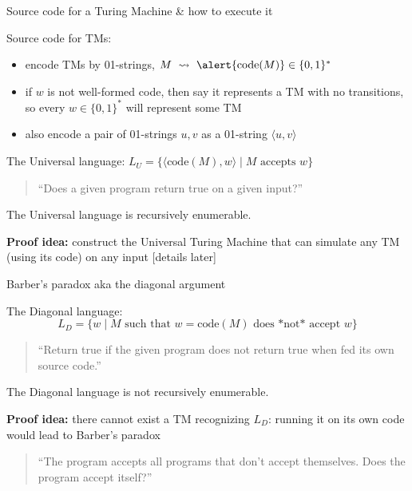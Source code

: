 \documentclass[handout]{beamer}
\begin{document}
\begin{frame}{Source code for a Turing Machine \& how to execute it}

    Source code for TMs:
    \begin{itemize}
        \item encode TMs by 01-strings, $M\ \rightsquigarrow\ \alert{\mathrm{code}(M)}\in\{0,1\}^*$
        \item if $w$ is not well-formed code, then say it represents a TM with no transitions, so every $w\in\{0,1\}^*$ will represent some TM
        \item also encode a pair of 01-strings $u,v$ as a 01-string $\langle u,v\rangle$
    \end{itemize}

    \medskip

    The \alert{Universal language}: $L_U=\{\langle \mathrm{code}(M),w\rangle\mid M\text{ accepts }w\}$

    \medskip
    
    \begin{quote}
        ``Does a given program return true on a given input?''
    \end{quote}

    \medskip

    \begin{theorem}
        The Universal language is recursively enumerable.
    \end{theorem}

    \textbf{Proof idea:} construct the \alert{Universal Turing Machine} that can simulate any TM (using its code) on any input [details later]

\end{frame}


\begin{frame}{Barber's paradox aka the diagonal argument}


    The \alert{Diagonal language}:
    $$
    L_D=\{w\mid M\text{ such that $w=\mathrm{code}(M)$ does *not* accept }w\}
    $$

    \medskip
    
    \begin{quote}
        ``Return true if the given program does not return true when fed its own source code.''
    \end{quote}

    \medskip

    \begin{theorem}
        The Diagonal language is not recursively enumerable.
    \end{theorem}

    \textbf{Proof idea:} there cannot exist a TM recognizing $L_
    D$: running it on its own code would lead to Barber's paradox

    \bigskip

    \begin{quote}
        ``The program accepts all programs that don't accept themselves. Does the program accept itself?''
    \end{quote}    

\end{frame}
\end{document}
